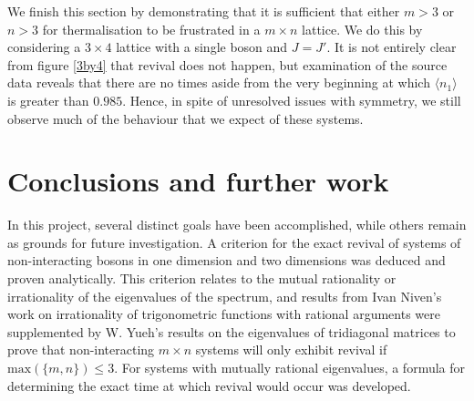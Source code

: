 \documentclass[prb, twocolumn, final]{revtex4-1}
\theoremstyle{plain}
\begin{document}
We finish this section by demonstrating that it is sufficient that either $m >
3$ or $n > 3$ for thermalisation to be frustrated in a $m \times n$ lattice.
We do this by considering a $3 \times 4$ lattice with a single boson and $J=J'$.
It is not entirely clear from figure \ref{3by4} that revival does not happen,
but examination of the source data reveals that there are no times aside from
the very beginning at which $\langle n_{1} \rangle$ is greater than $0.985$.
Hence, in spite of unresolved issues with symmetry, we still observe much of
the behaviour that we expect of these systems.


\section{Conclusions and further work}

In this project, several distinct goals have been accomplished, while others
remain as grounds for future investigation. A criterion for the exact revival
of systems of non-interacting bosons in one dimension and two dimensions was
deduced and proven analytically. This criterion relates to the mutual rationality or
irrationality of the eigenvalues of the spectrum, and results from Ivan Niven's
work on irrationality of trigonometric functions with rational arguments were
supplemented by W. Yueh's results on the eigenvalues of tridiagonal matrices
to prove that non-interacting $m\times n$ systems will only exhibit revival
if $\text{max}(\lbrace m,n \rbrace) \le 3$. For systems with mutually rational
eigenvalues, a formula for determining the exact time at which revival would
occur was developed.
\end{document}
